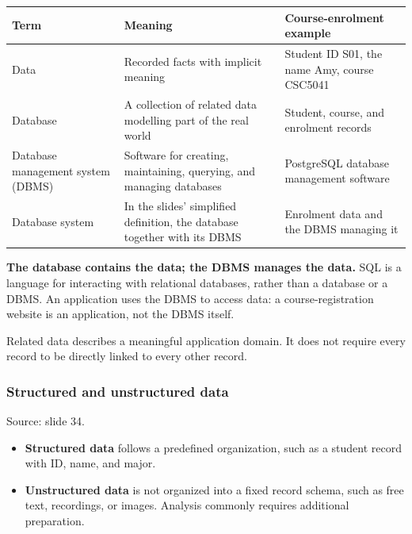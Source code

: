 \begin{longtable}[]{@{}
  >{\raggedright\arraybackslash}p{}
  >{\raggedright\arraybackslash}p{}
  >{\raggedright\arraybackslash}p{}@{}}
\toprule\noalign{}
\begin{minipage}[b]{\linewidth}\raggedright
Term
\end{minipage} & \begin{minipage}[b]{\linewidth}\raggedright
Meaning
\end{minipage} & \begin{minipage}[b]{\linewidth}\raggedright
Course-enrolment example
\end{minipage} \\
\midrule\noalign{}
\endhead
\bottomrule\noalign{}
\endlastfoot
Data & Recorded facts with implicit meaning & Student ID S01, the name Amy, course CSC5041 \\
Database & A collection of related data modelling part of the real world & Student, course, and enrolment records \\
Database management system (DBMS) & Software for creating, maintaining, querying, and managing databases & PostgreSQL database management software \\
Database system & In the slides' simplified definition, the database together with its DBMS & Enrolment data and the DBMS managing it \\
\end{longtable}

\textbf{The database contains the data; the DBMS manages the data.} SQL is a language for interacting with relational databases, rather than a database or a DBMS. An application uses the DBMS to access data: a course-registration website is an application, not the DBMS itself.

Related data describes a meaningful application domain. It does not require every record to be directly linked to every other record.

\subsubsection{Structured and unstructured data}\label{01_database_fundamentals_en-structured-and-unstructured-data}

Source: slide 34.

\begin{itemize}
\tightlist
\item
  \textbf{Structured data} follows a predefined organization, such as a student record with ID, name, and major.
\item
  \textbf{Unstructured data} is not organized into a fixed record schema, such as free text, recordings, or images. Analysis commonly requires additional preparation.
\end{itemize}

